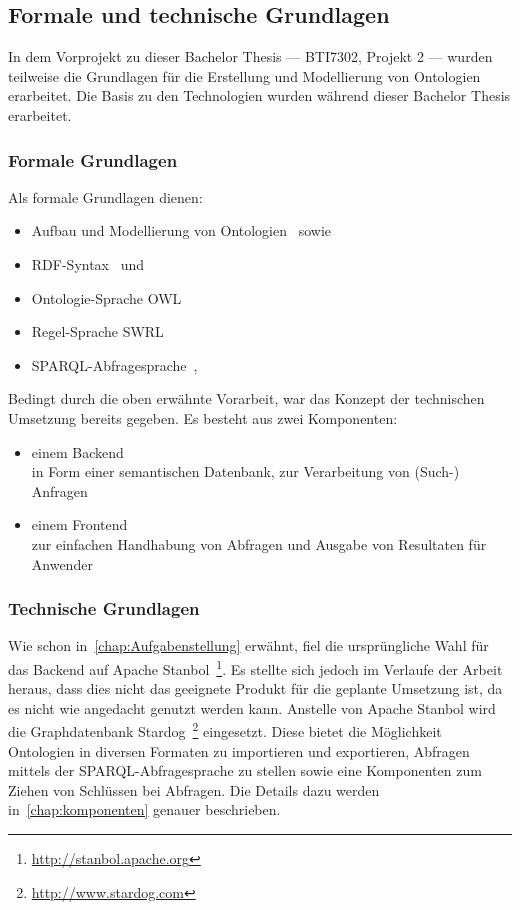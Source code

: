 \newpage

\subsection{Formale und technische Grundlagen}
\label{sub:formale_und_technische_grundlagen}
In dem Vorprojekt zu dieser Bachelor Thesis --- BTI7302, Projekt 2 --- wurden teilweise die Grundlagen für die Erstellung und Modellierung von Ontologien erarbeitet. Die Basis zu den Technologien wurden während dieser Bachelor Thesis erarbeitet.

\subsubsection{Formale Grundlagen}
Als formale Grundlagen dienen:
\begin{itemize}
    \item Aufbau und Modellierung von Ontologien~\cite{IspekOntoBedeutung} sowie~\cite{ISpekOntoGeschichte}
    \item RDF-Syntax~\cite{w3rdf} und~\cite{w3rdf_syntax}
    \item Ontologie-Sprache OWL~\cite{w3owl}
    \item Regel-Sprache SWRL~\cite{swrl}
    \item SPARQL-Abfragesprache~\cite{w3sparql_querylang},~\cite{w3sparql_overview}
\end{itemize}

Bedingt durch die oben erwähnte Vorarbeit, war das Konzept der technischen Umsetzung bereits gegeben. Es besteht aus zwei Komponenten:
\begin{itemize}
    \item einem Backend\\
        in Form einer semantischen Datenbank, zur Verarbeitung von (Such-) Anfragen
    \item einem Frontend\\
        zur einfachen Handhabung von Abfragen und Ausgabe von Resultaten für Anwender
\end{itemize}

\subsubsection{Technische Grundlagen}
Wie schon in~\autoref{chap:Aufgabenstellung} erwähnt, fiel die ursprüngliche Wahl für das Backend auf Apache Stanbol~\footnote{\url{http://stanbol.apache.org}}. Es stellte sich jedoch im Verlaufe der Arbeit heraus, dass dies nicht das geeignete Produkt für die geplante Umsetzung ist, da es nicht wie angedacht genutzt werden kann. Anstelle von Apache Stanbol wird die Graphdatenbank Stardog~\footnote{\url{http://www.stardog.com}} eingesetzt. Diese bietet die Möglichkeit Ontologien in diversen Formaten zu importieren und exportieren, Abfragen mittels der SPARQL-Abfragesprache zu stellen sowie eine Komponenten zum Ziehen von Schlüssen bei Abfragen. Die Details dazu werden in~\autoref{chap:komponenten} genauer beschrieben.

